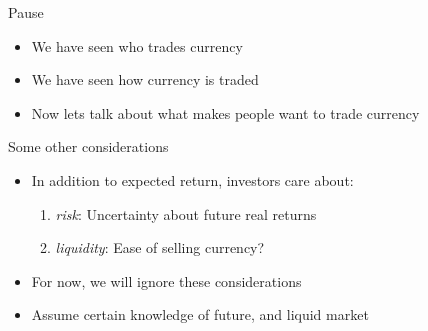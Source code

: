 \documentclass{beamer}
\begin{document}
\begin{frame}{Pause}
    \begin{itemize}
        \item We have seen who trades currency 
        \item We have seen how currency is traded
        \item Now lets talk about what makes people want to trade currency
    \end{itemize}
\end{frame}


\begin{frame}{Some other considerations}

    \begin{itemize}
        \item In addition to expected return, investors care about:
        \begin{enumerate}
            \item \emph{risk}: Uncertainty about future real returns
            \item \emph{liquidity}: Ease of selling currency?
        \end{enumerate}
        \item For now, we will ignore these considerations
        \item Assume certain knowledge of future, and liquid market
    \end{itemize}

\end{frame}
\end{document}
